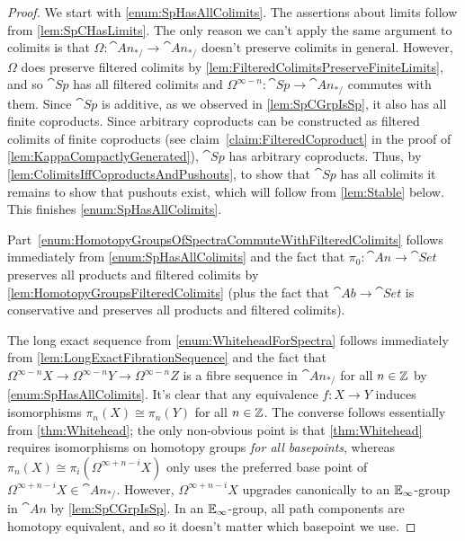 \begin{proof}
	We start with \cref{enum:SpHasAllColimits}. The assertions about limits follow from \cref{lem:SpCHasLimits}. The only reason we can't apply the same argument to colimits is that $\Omega\colon \cat{An}_{*/}\rightarrow \cat{An}_{*/}$ doesn't preserve colimits in general. However, $\Omega$ does preserve filtered colimits by \cref{lem:FilteredColimitsPreserveFiniteLimits}, and so $\cat{Sp}$ has all filtered colimits and $\Omega^{\infty-n}\colon \cat{Sp}\rightarrow \cat{An}_{*/}$ commutes with them. Since $\cat{Sp}$ is additive, as we observed in \cref{lem:SpCGrpIsSp}, it also has all finite coproducts. Since arbitrary coproducts can be constructed as filtered colimits of finite coproducts (see claim~\cref{claim:FilteredCoproduct} in the proof of \cref{lem:KappaCompactlyGenerated}), $\cat{Sp}$ has arbitrary coproducts. Thus, by \cref{lem:ColimitsIffCoproductsAndPushouts}, to show that $\cat{Sp}$ has all colimits it remains to show that pushouts exist, which will follow from \cref{lem:Stable} below. This finishes \cref{enum:SpHasAllColimits}.
	
	Part~\cref{enum:HomotopyGroupsOfSpectraCommuteWithFilteredColimits} follows immediately from \cref{enum:SpHasAllColimits} and the fact that $\pi_0\colon \cat{An}\rightarrow \cat{Set}$ preserves all products and filtered colimits by \cref{lem:HomotopyGroupsFilteredColimits} (plus the fact that $\cat{Ab}\rightarrow\cat{Set}$ is conservative and preserves all products and filtered colimits).
	
	The long exact sequence from \cref{enum:WhiteheadForSpectra} follows immediately from \cref{lem:LongExactFibrationSequence} and the fact that $\Omega^{\infty-n}X\rightarrow \Omega^{\infty-n}Y\rightarrow \Omega^{\infty-n}Z$ is a fibre sequence in $\cat{An}_{*/}$ for all $n\in\mathbb{Z}$ by \cref{enum:SpHasAllColimits}. It's clear that any equivalence $f\colon X\rightarrow Y$ induces isomorphisms $\pi_n(X)\cong \pi_n(Y)$ for all $n\in\mathbb{Z}$. The converse follows essentially from \cref{thm:Whitehead}; the only non-obvious point is that \cref{thm:Whitehead} requires isomorphisms on homotopy groups \emph{for all basepoints}, whereas $\pi_n(X)\cong \pi_i(\Omega^{\infty+n-i}X)$ only uses the preferred base point of $\Omega^{\infty+n-i}X\in\cat{An}_{*/}$. However, $\Omega^{\infty+n-i}X$ upgrades canonically to an $\mathbb{E}_\infty$-group in $\cat{An}$ by \cref{lem:SpCGrpIsSp}. In an $\mathbb{E}_\infty$-group, all path components are homotopy equivalent, and so it doesn't matter which basepoint we use.
\end{proof}

